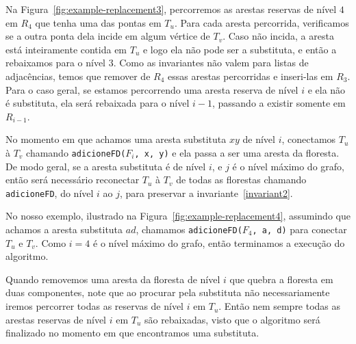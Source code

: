Na Figura~\ref{fig:example-replacement3}, percorremos as arestas reservas de nível $4$ em $R_4$ que tenha uma das pontas em $T_u$. Para cada aresta percorrida, verificamos se a outra ponta dela incide em algum vértice de $T_v$. Caso não incida, a aresta está inteiramente contida em $T_u$ e logo ela não pode ser a substituta, e então a rebaixamos para o nível $3$. Como as invariantes não valem para listas de adjacências, temos que remover de $R_4$ essas arestas percorridas e inseri-las em $R_3$. Para o caso geral, se estamos percorrendo uma aresta reserva de nível $i$ e ela não é substituta, ela será rebaixada para o nível $i-1$, passando a existir somente em $R_{i-1}$. 

No momento em que achamos uma aresta substituta $xy$ de nível $i$, conectamos $T_u$ à $T_v$ chamando \texttt{adicioneFD($F_i$, x, y)} e ela passa a ser uma aresta da floresta. De modo geral, se a aresta substituta é de nível $i$, e $j$ é o nível máximo do grafo, então será necessário reconectar $T_u$ à $T_v$ de todas as florestas chamando \texttt{adicioneFD}, do nível $i$ ao $j$, para preservar a invariante~\ref{invariant2}.

No nosso exemplo, ilustrado na Figura~\ref{fig:example-replacement4}, assumindo que achamos a aresta substituta $ad$, chamamos \texttt{adicioneFD($F_4$, a, d)} para conectar $T_u$ e $T_v$. Como $i = 4$ é o nível máximo do grafo, então terminamos a execução do algoritmo.

Quando removemos uma aresta da floresta de nível $i$ que quebra a floresta em duas componentes, note que ao procurar pela substituta não necessariamente iremos percorrer todas as reservas de nível $i$ em $T_u$. Então nem sempre todas as arestas reservas de nível $i$ em $T_u$ são rebaixadas, visto que o algoritmo será finalizado no momento em que encontramos uma substituta.

